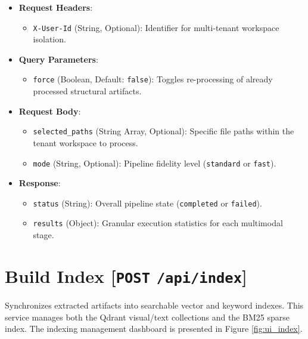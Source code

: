 \begin{itemize}
    \item \textbf{Request Headers}:
    \begin{itemize}
        \item \texttt{X-User-Id} (String, Optional): Identifier for multi-tenant workspace isolation.
    \end{itemize}
    \item \textbf{Query Parameters}:
    \begin{itemize}
        \item \texttt{force} (Boolean, Default: \texttt{false}): Toggles re-processing of already processed structural artifacts.
    \end{itemize}
    \item \textbf{Request Body}:
    \begin{itemize}
        \item \texttt{selected\_paths} (String Array, Optional): Specific file paths within the tenant workspace to process. 
        \item \texttt{mode} (String, Optional): Pipeline fidelity level (\texttt{standard} or \texttt{fast}).
    \end{itemize}
    \item \textbf{Response}:
    \begin{itemize}
        \item \texttt{status} (String): Overall pipeline state (\texttt{completed} or \texttt{failed}).
        \item \texttt{results} (Object): Granular execution statistics for each multimodal stage.
    \end{itemize}
\end{itemize}

\section*{Build Index [\texttt{POST} \texttt{/api/index}]}
Synchronizes extracted artifacts into searchable vector and keyword indexes. This service manages both the Qdrant visual/text collections and the BM25 sparse index. The indexing management dashboard is presented in Figure \ref{fig:ui_index}.

